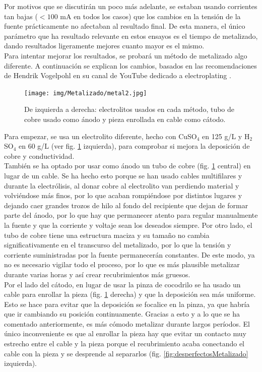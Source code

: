\documentclass[11pt,a4paper,twoside,pdf]{article}
\numberwithin{equation}{section}
\begin{document}
Por motivos que se discutirán un poco más adelante, se estaban usando corrientes tan bajas ($<100$ mA en todos los casos) que los cambios en la tensión de la fuente prácticamente no afectaban al resultado final. De esta manera, el único parámetro que ha resultado relevante en estos ensayos es el tiempo de metalizado, dando resultados ligeramente mejores cuanto mayor es el mismo.\\

Para intentar mejorar los resultados, se probará un método de metalizado algo diferente. A continuación se explican los cambios, basados en las recomendaciones de Hendrik Vogelpohl en su canal de YouTube dedicado a electroplating \cite{hen3drik}.
\begin{figure}[!h]
    \centering
    \texttt{[image: img/Metalizado/metal2.jpg]}
    \vspace{-0.1cm}
    \caption{De izquierda a derecha: electrolitos usados en cada método, tubo de cobre usado como ánodo y pieza enrollada en cable como cátodo.}
    \label{fig:metalizado2}
\end{figure}

Para empezar, se usa un electrolito diferente, hecho con CuSO$_4$ en 125 g/L y H$_2$SO$_4$ en 60 g/L (ver fig. \ref{fig:metalizado2} izquierda), para comprobar si mejora la deposición de cobre y conductividad.\\

También se ha optado por usar como ánodo un tubo de cobre (fig. \ref{fig:metalizado2} central) en lugar de un cable. Se ha hecho esto porque se han usado cables multifilares y durante la electrólisis, al donar cobre al electrolito van perdiendo material y volviéndose más finos, por lo que acaban rompiéndose por distintos lugares y dejando caer grandes trozos de hilo al fondo del recipiente que dejan de formar parte del ánodo, por lo que hay que permanecer atento para regular manualmente la fuente y que la corriente y voltaje sean los deseados siempre. Por otro lado, el tubo de cobre tiene una estructura maciza y su tamaño no cambia significativamente en el transcurso del metalizado, por lo que la tensión y corriente suministradas por la fuente permanecerán constantes. De este modo, ya no es necesario vigilar todo el proceso, por lo que es más plausible metalizar durante varias horas y así crear recubrimientos más gruesos.\\

Por el lado del cátodo, en lugar de usar la pinza de cocodrilo se ha usado un cable para enrollar la pieza (fig. \ref{fig:metalizado2} derecha) y que la deposición sea más uniforme. Esto se hace para evitar que la deposición se focalice en la pinza, ya que habría que ir cambiando su posición continuamente. Gracias a esto y a lo que se ha comentado anteriormente, es más cómodo metalizar durante largos períodos. El único inconveniente es que al enrollar la pieza hay que evitar un contacto muy estrecho entre el cable y la pieza porque el recubrimiento acaba conectando el cable con la pieza y se desprende al separarlos (fig. \ref{fig:desperfectosMetalizado} izquierda).\\
\end{document}
